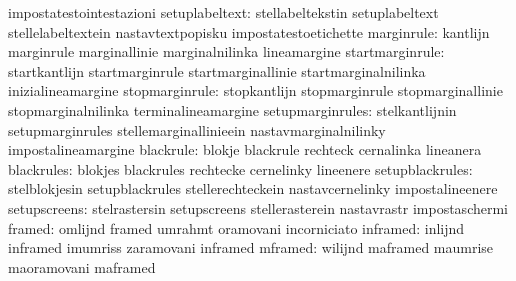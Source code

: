                                   impostatestointestazioni
                  setuplabeltext: stellabeltekstin                 setuplabeltext
                                  stellelabeltextein               nastavtextpopisku
                                  impostatestoetichette
                      marginrule: kantlijn                         marginrule
                                  marginallinie                    marginalnilinka
                                  lineamargine
                 startmarginrule: startkantlijn                    startmarginrule
                                  startmarginallinie               startmarginalnilinka
                                  inizialineamargine
                  stopmarginrule: stopkantlijn                     stopmarginrule
                                  stopmarginallinie                stopmarginalnilinka
                                  terminalineamargine
                setupmarginrules: stelkantlijnin                   setupmarginrules
                                  stellemarginallinieein           nastavmarginalnilinky
                                  impostalineamargine
                       blackrule: blokje                           blackrule
                                  rechteck                         cernalinka
                                  lineanera
                      blackrules: blokjes                          blackrules
                                  rechtecke                        cernelinky
                                  lineenere
                 setupblackrules: stelblokjesin                    setupblackrules
                                  stellerechteckein                nastavcernelinky
                                  impostalineenere
                    setupscreens: stelrastersin                    setupscreens
                                  stellerasterein                  nastavrastr
                                  impostaschermi
                          framed: omlijnd                          framed
                                  umrahmt                          oramovani
                                  incorniciato
                        inframed: inlijnd                          inframed
                                  imumriss                         zaramovani
                                  inframed                         %
                         mframed: wilijnd                          maframed
                                  maumrise                         maoramovani
                                  maframed
